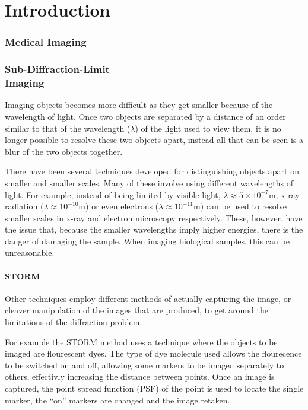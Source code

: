 \part{Introduction}

\section{Medical Imaging}
\label{sec:section_name}

\section[Sub-Diffraction-Limit Imaging]{Sub-Diffraction-Limit\\ Imaging}
\label{sec:sub_diffraction_limit_imaging}

Imaging objects becomes more difficult as they get smaller because of the
wavelength of light. Once two objects are separated by a distance of an order
similar to that of the wavelength ($\lambda$) of the light used to view them,
it is no longer possible to resolve these two objects apart, instead all that
can be seen is a blur of the two objects together.

There have been several techniques developed for distinguishing objects apart
on smaller and smaller scales. Many of these involve using different
wavelengths of light.  For example, instead of being limited by visible light,
$\lambda \approx 5\times 10^{-7} \textrm{m}$, x-ray radiation ($\lambda \approx
10^{-10} \textrm{m}$) or even electrons ($\lambda \approx 10^{-11} \textrm{m}$)
can be used to resolve smaller scales in x-ray and electron microscopy
respectively. These, however, have the issue that, because the smaller
wavelengths imply higher energies, there is the danger of damaging the sample.
When imaging biological samples, this can be unreasonable.

\subsection{STORM}
\label{sub:storm}

Other techniques employ different methods of actually capturing the image, or
cleaver manipulation of the images that are produced, to get around the
limitations of the diffraction problem.

For example the STORM method\cite{rust2006sub} uses a technique where the
objects to be imaged are flourescent dyes. The type of dye molecule used allows
the flourecence to be switched on and off, allowing some markers to be imaged
separately to others, effectivly increasing the distance between points. Once
an image is captured, the point spread function (PSF) of the point is used to
locate the single marker, the ``on'' markers are changed and the image retaken.
